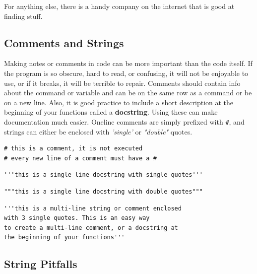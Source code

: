 \documentclass[%
oneside,                 %
final,                   %
10pt]{article}
\begin{document}
For anything else, there is a handy company on the internet that is good at finding stuff.


\subsection{Comments and Strings}

Making notes or comments in code can be more important than the code itself. If the program is so obscure, hard to read, or confusing, it will not be enjoyable to use, or if it breaks, it will be terrible to repair. Comments should contain info about the command or variable and  can be on the same row as a command or be on a new line. Also, it is good practice to include a short description at the beginning of your functions called a \textbf{docstring}. Using these can make documentation much easier. Oneline comments are simply prefixed with \Verb!#!, and strings can either be enclosed with \emph{'single'} or \emph{"double"} quotes.

\begin{Verbatim}[numbers=none,fontsize=\fontsize{9pt}{9pt},baselinestretch=0.95,xleftmargin=2mm]
# this is a comment, it is not executed
# every new line of a comment must have a #
\end{Verbatim}

\begin{Verbatim}[numbers=none,fontsize=\fontsize{9pt}{9pt},baselinestretch=0.95,xleftmargin=2mm]
'''this is a single line docstring with single quotes'''
\end{Verbatim}

\begin{Verbatim}[numbers=none,fontsize=\fontsize{9pt}{9pt},baselinestretch=0.95,xleftmargin=2mm]
"""this is a single line docstring with double quotes"""
\end{Verbatim}

\begin{Verbatim}[numbers=none,fontsize=\fontsize{9pt}{9pt},baselinestretch=0.95,xleftmargin=2mm]
'''this is a multi-line string or comment enclosed
with 3 single quotes. This is an easy way
to create a multi-line comment, or a docstring at
the beginning of your functions'''
\end{Verbatim}

\subsection{String Pitfalls}
\end{document}
